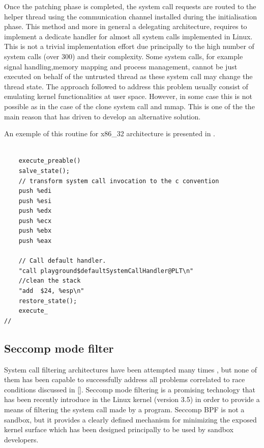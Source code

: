 Once the patching phase is completed, the system call requests are routed to the helper thread using the communication channel installed during the initialisation phase. This method and more in general a delegating architecture, requires to implement a dedicate handler for almost all system calls implemented in Linux. This is not a trivial implementation effort due principally to the high number of system calls (over 300) and their complexity. Some system calls, for example signal handling,memory mapping and process management, cannot be just executed on behalf of the untrusted thread as these system call may change the thread state.
The approach followed to address this problem usually consist of emulating kernel functionalities  at user space. However, in some case this is not possible as in the case of the clone system call and mmap. This is  one of the the main reason that has driven to develop an alternative solution.   

An exemple of this routine for x86\_32 architecture is presented in . 

\begin{lstlisting} 
	
	execute_preable()
	salve_state(); 
	// transform system call invocation to the c convention	
 	push %edi
    push %esi
    push %edx
    push %ecx
    push %ebx
    push %eax
    
    // Call default handler.
 	"call playground$defaultSystemCallHandler@PLT\n"
 	//clean the stack
 	"add  $24, %esp\n"
    restore_state(); 
    execute_
//

\end{lstlisting}


\subsection{Seccomp mode filter}
\label{filter}
           

System call filtering architectures have been attempted many times \cite{Janus , others}, but none of them has been capable to successfully address all problems correlated to race conditions discussed in \ref{}. Seccomp mode filtering is a promising technology that has been recently introduce in the Linux kernel (version 3.5) in order to provide a means of filtering the system call made by a program. Seccomp BPF is not a sandbox, but it provides a clearly defined mechanism for minimizing the exposed kernel surface which has been designed principally to be used by sandbox developers. 

